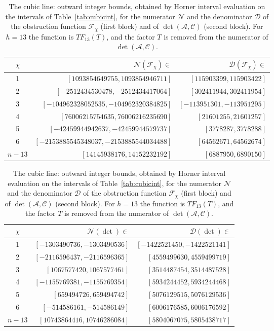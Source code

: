 \documentclass{amsart}
\theoremstyle{definition}
\theoremstyle{remark}
\numberwithin{equation}{section}
\begin{document}
\begin{table}[H]\small\centering
\caption{The cubic line: outward integer bounds, obtained by Horner interval evaluation on the intervals of Table~\ref{tab:cubicint}, for the numerator $\mathcal N$ and the denominator $\mathcal D$ of the obstruction function $\mathcal F_\chi$ (first block) and of $\det(\mathcal A,\mathcal C)$ (second block). For $h=13$ the function is $TF_{13}(T)$, and the factor $T$ is removed from the numerator of $\det(\mathcal A,\mathcal C)$.}\label{tab:cubicbounds}
\begin{tabular}{crr}\toprule
$\chi$&$\mathcal N(\mathcal F_\chi)\in$&$\mathcal D(\mathcal F_\chi)\in$\\\midrule
1&$[1093854649755,1093854946711]$&$[115903399,115903422]$\\
2&$[-2512434530478,-2512434417064]$&$[302411944,302411954]$\\
3&$[-104962328052535,-104962320384825]$&$[-113951301,-113951295]$\\
4&$[76006215754635,76006216235690]$&$[21601255,21601257]$\\
5&$[-42459944942637,-42459944579737]$&$[3778287,3778288]$\\
6&$[-2153885545348037,-2153885544034488]$&$[64562671,64562674]$\\
$n-13$&$[14145938176,14152232192]$&$[6887950,6890150]$\\
\bottomrule\end{tabular}\par\medskip
\begin{tabular}{crr}\toprule
$\chi$&$\mathcal N(\det)\in$&$\mathcal D(\det)\in$\\\midrule
1&$[-1303490736,-1303490536]$&$[-1422521450,-1422521141]$\\
2&$[-2116596437,-2116596365]$&$[4559499630,4559499719]$\\
3&$[1067577420,1067577461]$&$[3514487454,3514487528]$\\
4&$[-1155769381,-1155769354]$&$[5934244452,5934244468]$\\
5&$[659494726,659494742]$&$[5076129515,5076129536]$\\
6&$[-514586161,-514586149]$&$[6006176585,6006176592]$\\
$n-13$&$[10743864416,10746286084]$&$[5804067075,5805438717]$\\
\bottomrule\end{tabular}\end{table}
\end{document}
